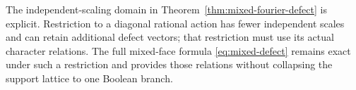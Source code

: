 The independent-scaling domain in Theorem~\ref{thm:mixed-fourier-defect} is explicit. Restriction to a diagonal rational action has fewer independent scales and can retain additional defect vectors; that restriction must use its actual character relations. The full mixed-face formula \eqref{eq:mixed-defect} remains exact under such a restriction and provides those relations without collapsing the support lattice to one Boolean branch.
